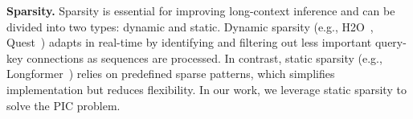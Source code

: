 
\textbf{Sparsity.}
Sparsity is essential for improving long-context inference and can be divided into two types: dynamic and static. 
Dynamic sparsity (e.g., H2O~\cite{zhang2024h2o}, Quest~\cite{Quest-ICML24}) adapts in real-time by identifying and filtering out less important query-key connections as sequences are processed. 
In contrast, static sparsity (e.g., Longformer~\cite{longformer}) relies on predefined sparse patterns, which simplifies implementation but reduces flexibility.
%
In our work, we leverage static sparsity to solve the PIC problem.